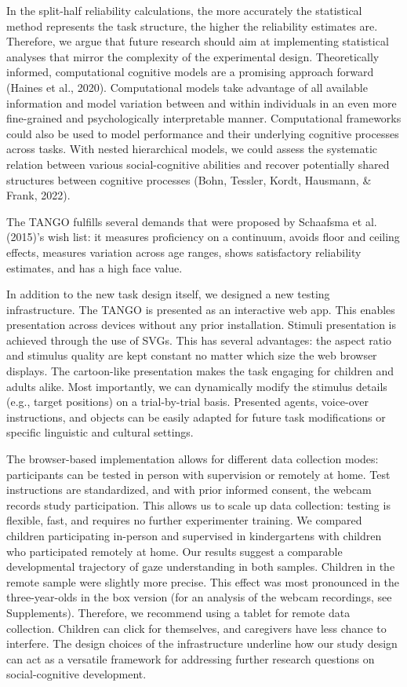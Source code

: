 \documentclass[
  man,floatsintext]{apa7}
\begin{document}
In the split-half reliability calculations, the more accurately the statistical method represents the task structure, the higher the reliability estimates are.
Therefore, we argue that future research should aim at implementing statistical analyses that mirror the complexity of the experimental design.
Theoretically informed, computational cognitive models are a promising approach forward (Haines et al., 2020).
Computational models take advantage of all available information and model variation between and within individuals in an even more fine-grained and psychologically interpretable manner.
Computational frameworks could also be used to model performance and their underlying cognitive processes across tasks.
With nested hierarchical models, we could assess the systematic relation between various social-cognitive abilities and recover potentially shared structures between cognitive processes (Bohn, Tessler, Kordt, Hausmann, \& Frank, 2022).

The TANGO fulfills several demands that were proposed by Schaafsma et al. (2015)'s wish list: it measures proficiency on a continuum, avoids floor and ceiling effects, measures variation across age ranges, shows satisfactory reliability estimates, and has a high face value.

In addition to the new task design itself, we designed a new testing infrastructure.
The TANGO is presented as an interactive web app.
This enables presentation across devices without any prior installation.
Stimuli presentation is achieved through the use of SVGs.
This has several advantages: the aspect ratio and stimulus quality are kept constant no matter which size the web browser displays.
The cartoon-like presentation makes the task engaging for children and adults alike.
Most importantly, we can dynamically modify the stimulus details (e.g., target positions) on a trial-by-trial basis.
Presented agents, voice-over instructions, and objects can be easily adapted for future task modifications or specific linguistic and cultural settings.

The browser-based implementation allows for different data collection modes: participants can be tested in person with supervision or remotely at home.
Test instructions are standardized, and with prior informed consent, the webcam records study participation.
This allows us to scale up data collection: testing is flexible, fast, and requires no further experimenter training.
We compared children participating in-person and supervised in kindergartens with children who participated remotely at home.
Our results suggest a comparable developmental trajectory of gaze understanding in both samples.
Children in the remote sample were slightly more precise.
This effect was most pronounced in the three-year-olds in the box version (for an analysis of the webcam recordings, see Supplements).
Therefore, we recommend using a tablet for remote data collection.
Children can click for themselves, and caregivers have less chance to interfere.
The design choices of the infrastructure underline how our study design can act as a versatile framework for addressing further research questions on social-cognitive development.
\end{document}
